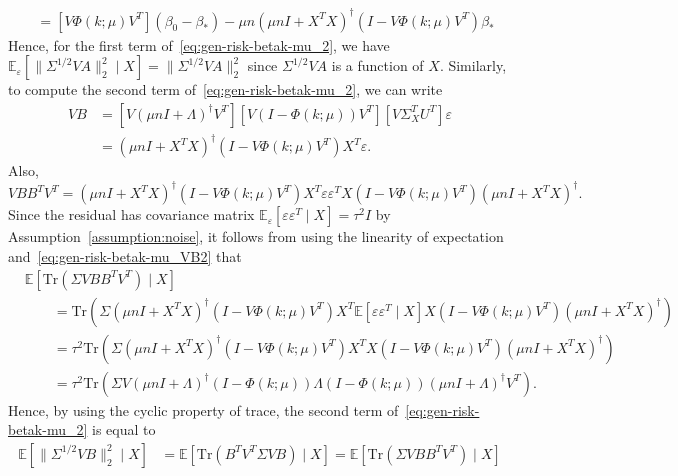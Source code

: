 \documentclass[11pt]{article}
\newenvironment{proof*}
  {\par\pushQED{\qed}\normalfont\ignorespaces}
  {\popQED\par}
\begin{document}
\begin{proof*}
\begin{align}
    &= [V \Phi(k; \mu) V^T] (\beta_0 - \beta_*) - \mu n (\mu n I + X^T X)^{\dagger} (I - V \Phi(k; \mu) V^T) \beta_* \label{eq:gen-risk-betak-mu_VA}
\end{align}
Hence, for the first term of~\eqref{eq:gen-risk-betak-mu_2}, we have $\mathbb{E}_{\varepsilon}\left[ \| \Sigma^{1/2} V A \|_2^2 \mid X \right] = \| \Sigma^{1/2} V A \|_2^2$ since $\Sigma^{1/2} VA$ is a function of $X$.
Similarly, to compute the second term of~\eqref{eq:gen-risk-betak-mu_2}, we can write
\begin{align}
    VB &= [V(\mu n I + \Lambda)^{\dagger} V^T][V (I - \Phi(k; \mu)) V^T] [V \Sigma_X^T U^T] \varepsilon \nonumber \\
    &= (\mu n I + X^T X)^{\dagger} (I - V \Phi(k;\mu) V^T) X^T \varepsilon. \label{eq:gen-risk-betak-mu_VB}
\end{align}
Also,
\begin{equation} \label{eq:gen-risk-betak-mu_VB2}
    V B B^T V^T = (\mu n I + X^T X)^{\dagger} (I - V \Phi(k;\mu) V^T) X^T \varepsilon \varepsilon^T X (I - V \Phi(k;\mu) V^T) (\mu n I + X^T X)^{\dagger}.
\end{equation}
Since the residual has covariance matrix $\mathbb{E}_{\varepsilon}[ \varepsilon \varepsilon^T \mid X] = \tau^2 I$ by Assumption~\ref{assumption:noise}, it follows from using the linearity of expectation and~\eqref{eq:gen-risk-betak-mu_VB2} that
\begin{align*}
    &\mathbb{E}[ \mathrm{Tr}(\Sigma V B B^T V^T) \mid X ] \\
    &\quad\quad= \mathrm{Tr}( \Sigma (\mu n I + X^T X)^{\dagger} (I - V \Phi(k;\mu) V^T) X^T \mathbb{E}\left[ \varepsilon \varepsilon^T \mid X \right] X (I - V \Phi(k;\mu) V^T) (\mu n I + X^T X)^{\dagger} ) \\
    &\quad\quad= \tau^2 \mathrm{Tr}( \Sigma (\mu n I + X^T X)^{\dagger} (I - V \Phi(k;\mu) V^T) X^T X (I - V \Phi(k;\mu) V^T) (\mu n I + X^T X)^{\dagger} ) \\
    &\quad\quad= \tau^2 \mathrm{Tr}( \Sigma V (\mu n I + \Lambda)^{\dagger} (I - \Phi(k;\mu)) \Lambda (I - \Phi(k;\mu)) (\mu n I + \Lambda)^{\dagger} V^T).
\end{align*}
Hence, by using the cyclic property of trace, the second term of~\eqref{eq:gen-risk-betak-mu_2} is equal to
\begin{align*}
    \mathbb{E}[\| \Sigma^{1/2} V B \|_2^2 \mid X]
    &= \mathbb{E}[ \mathrm{Tr}( B^T V^T \Sigma V B ) \mid X ]
    = \mathbb{E}[ \mathrm{Tr}(\Sigma V B B^T V^T) \mid X ] \\

\end{align*}
\end{proof*}
\end{document}
